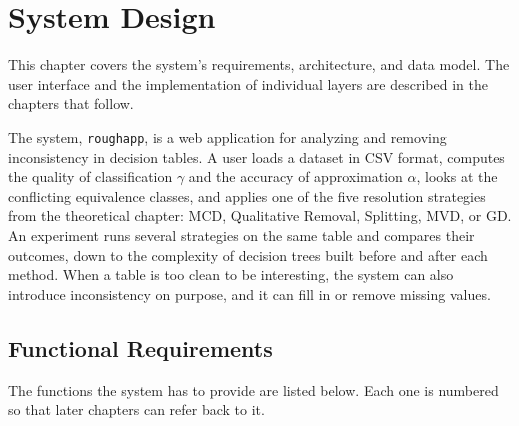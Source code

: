 \chapter{System Design}

This chapter covers the system's requirements, architecture, and data model. The user interface and the implementation of individual layers are described in the chapters that follow.

The system, \texttt{roughapp}, is a web application for analyzing and removing inconsistency in decision tables. A user loads a dataset in CSV format, computes the quality of classification $\gamma$ and the accuracy of approximation $\alpha$, looks at the conflicting equivalence classes, and applies one of the five resolution strategies from the theoretical chapter: MCD, Qualitative Removal, Splitting, MVD, or GD. An experiment runs several strategies on the same table and compares their outcomes, down to the complexity of decision trees built before and after each method. When a table is too clean to be interesting, the system can also introduce inconsistency on purpose, and it can fill in or remove missing values.

\section{Functional Requirements}

The functions the system has to provide are listed below. Each one is numbered so that later chapters can refer back to it.

